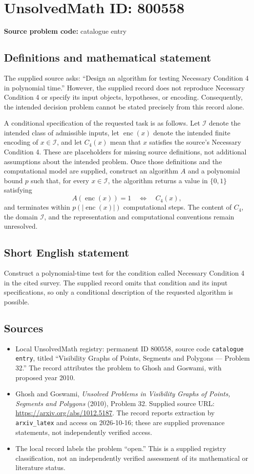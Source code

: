 \documentclass[11pt]{article}
\begin{document}
\section*{UnsolvedMath ID: 800558}
\textbf{Source problem code:} catalogue entry
\subsection{Definitions and mathematical statement}
The supplied source asks: ``Design an algorithm for testing Necessary Condition 4 in polynomial time.'' However, the supplied record does not reproduce Necessary Condition 4 or specify its input objects, hypotheses, or encoding. Consequently, the intended decision problem cannot be stated precisely from this record alone.

A conditional specification of the requested task is as follows. Let \(\mathcal I\) denote the intended class of admissible inputs, let \(\operatorname{enc}(x)\) denote the intended finite encoding of \(x\in\mathcal I\), and let \(C_4(x)\) mean that \(x\) satisfies the source's Necessary Condition 4. These are placeholders for missing source definitions, not additional assumptions about the intended problem. Once those definitions and the computational model are supplied, construct an algorithm \(A\) and a polynomial bound \(p\) such that, for every \(x\in\mathcal I\), the algorithm returns a value in \(\{0,1\}\) satisfying
\[
A(\operatorname{enc}(x))=1\quad\Longleftrightarrow\quad C_4(x),
\]
and terminates within \(p(|\operatorname{enc}(x)|)\) computational steps. The content of \(C_4\), the domain \(\mathcal I\), and the representation and computational conventions remain unresolved.
\subsection{Short English statement}
Construct a polynomial-time test for the condition called Necessary Condition 4 in the cited survey. The supplied record omits that condition and its input specifications, so only a conditional description of the requested algorithm is possible.
\subsection{Sources}
\begin{itemize}
\item Local UnsolvedMath registry: permanent ID \(800558\), source code \texttt{catalogue entry}, titled ``Visibility Graphs of Points, Segments and Polygons --- Problem 32.'' The record attributes the problem to Ghosh and Goswami, with proposed year 2010.
\item Ghosh and Goswami, \emph{Unsolved Problems in Visibility Graphs of Points, Segments and Polygons} (2010), Problem 32. Supplied source URL: \url{https://arxiv.org/abs/1012.5187}. The record reports extraction by \texttt{arxiv\_latex} and access on 2026-10-16; these are supplied provenance statements, not independently verified access.
\item The local record labels the problem ``open.'' This is a supplied registry classification, not an independently verified assessment of its mathematical or literature status.
\end{itemize}
\end{document}
